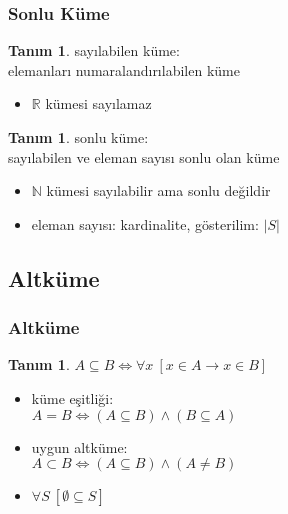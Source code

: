 \documentclass[dvipsnames]{beamer}
\theoremstyle{definition}
\newtheorem{tanim}[theorem]{Tanım}
\theoremstyle{example}
\theoremstyle{plain}
\begin{document}
\begin{frame}
  \frametitle{Sonlu Küme}

  \begin{tanim}
    \alert{sayılabilen küme}:\\
      elemanları numaralandırılabilen küme

    \begin{itemize}
      \item $\mathbb{R}$ kümesi sayılamaz
    \end{itemize}
  \end{tanim}

  \pause
  \begin{tanim}
    \alert{sonlu küme}:\\
      sayılabilen ve eleman sayısı sonlu olan küme

    \begin{itemize}
      \item $\mathbb{N}$ kümesi sayılabilir ama sonlu değildir
      \item eleman sayısı: \alert{kardinalite}, gösterilim: $|S|$
    \end{itemize}
  \end{tanim}
\end{frame}

\subsection{Altküme}

\begin{frame}
  \frametitle{Altküme}

  \begin{tanim}
    $A \subseteq B \Leftrightarrow \forall x~[x \in A \rightarrow x \in B]$
  \end{tanim}

  \pause
  \begin{itemize}
    \item \alert{küme eşitliği}:\\
      $A = B \Leftrightarrow (A \subseteq B) \wedge (B \subseteq A)$

    \pause
    \item \alert{uygun altküme}:\\
      $A \subset B \Leftrightarrow (A \subseteq B) \wedge (A \neq B)$

    \pause
    \item $\forall S~[\emptyset \subseteq S]$
  \end{itemize}
\end{frame}
\end{document}

